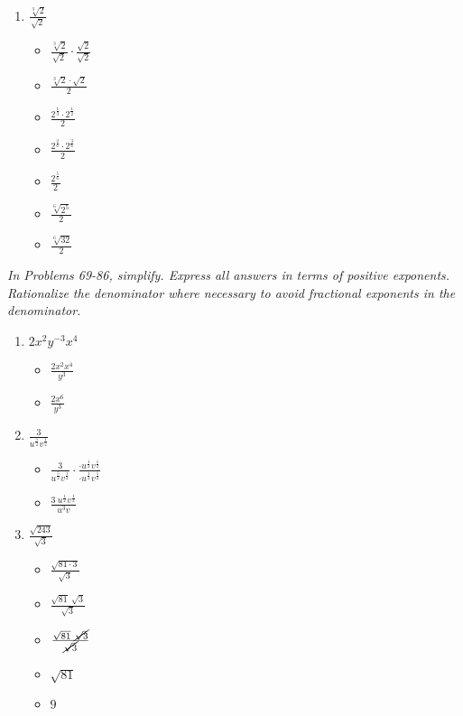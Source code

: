 \documentclass{article}
\begin{document}
\begin{onehalfspace}
\begin{enumerate}[start=59]
        \item $\frac{\sqrt[3]{2}}{\sqrt{2}}$
        \begin{itemize}
            \item $\frac{\sqrt[3]{2}}{\sqrt{2}} \cdot \frac{\sqrt{2}}{\sqrt{2}}$
            \item $\frac{\sqrt[3]{2} \cdot \sqrt{2}}{2}$
            \item $\frac{2^{\frac{1}{3}} \cdot 2^{\frac{1}{2}}}{2}$
            \item $\frac{2^{\frac{2}{6}} \cdot 2^{\frac{3}{6}}}{2}$
            \item $\frac{2^{\frac{5}{6}}}{2}$
            \item $\frac{\sqrt[6]{2^{5}}}{2}$
            \item $\frac{\sqrt[6]{32}}{2}$
        \end{itemize}
     \end{enumerate}

     \textit{
        In Problems 69-86, simplify. Express all answers
        in terms of positive exponents. Rationalize the denominator
        where necessary to avoid fractional exponents in the denominator.
     }
     \begin{enumerate}[start=69]
        \item $2x^{2}y^{-3}x^{4}$
        \begin{itemize}
            \item $\frac{2x^{2}x^{4}}{y^{3}}$
            \item $\frac{2x^{6}}{y^{3}}$
        \end{itemize}

        \item $\frac{3}{u^{\frac{5}{2}} v^{\frac{1}{2}}}$
        \begin{itemize}
            \item $\frac{3}{u^{\frac{5}{2}} v^{\frac{1}{2}}} \cdot \frac{\cdot u^{\frac{1}{2}} v^{\frac{1}{2}}}{\cdot u^{\frac{1}{2}} v^{\frac{1}{2}}}$
            \item $\frac{3 \ u^{\frac{1}{2}} v^{\frac{1}{2}}}{u^{3}v}$
        \end{itemize}

        \item $\frac{\sqrt{243}}{\sqrt{3}}$
        \begin{itemize}
            \item $\frac{\sqrt{81 \cdot 3}}{\sqrt{3}}$
            \item $\frac{\sqrt{81} \ \sqrt{3}}{\sqrt{3}}$
            \item $\frac{\sqrt{81} \ \cancel{\sqrt{3}}}{\cancel{\sqrt{3}}}$
            \item $\sqrt{81}$
            \item $9$
        \end{itemize}


\end{enumerate}
\end{onehalfspace}
\end{document}
